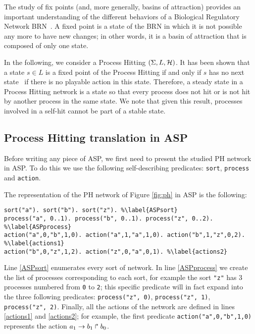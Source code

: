 The study of fix points (and, more generally, basins of attraction) provides an important understanding of the different behaviors of a Biological Regulatory Network BRN~\cite{wuensche1998genomic}.
%
A fixed point is a state of the BRN in which it is not possible any more to have new changes;
in other words, it is a basin of attraction that is composed of only one state.

In the following, we consider a Process Hitting $(\Sigma, L, \mathcal{H})$.
It has been shown that a state $s \in L$ is a fixed point of the Process Hitting if and only if $s$ has no next state~\cite{PMR10-TCSB} \ie if there is no playable action in this state.
Therefore, a steady state in a Process Hitting network is a state so that
every process does not hit or is not hit by another process in the same state.
We note that given this result, processes involved in a self-hit cannot be part of a stable state.

\subsection{Process Hitting translation in ASP}
Before writing any piece of ASP,
we first need to present the studied PH network in ASP.
To do this we use the following self-describing predicates:
\texttt{sort}, \texttt{process} and \texttt{action}.

\begin{example}
\label{ex:asp-ph}
The representation of the PH network of Figure \ref{fig:ph} in ASP is the following:
\begin{lstlisting}
sort("a"). sort("b"). sort("z"). %\label{ASPsort}
process("a", 0..1). process("b", 0..1). process("z", 0..2). %\label{ASPprocess}
action("a",0,"b",1,0). action("a",1,"a",1,0). action("b",1,"z",0,2). %\label{actions1}
action("b",0,"z",1,2). action("z",0,"a",0,1). %\label{actions2}
\end{lstlisting}
Line \ref{ASPsort} enumerates every sort of network.
In line \ref{ASPprocess} we create the list of processes corresponding to each sort,
for example the sort \texttt{"z"} has 3 processes numbered from \texttt{0} to \texttt{2};
this specific predicate will in fact expand into the three following predicates:
\texttt{process("z", 0)}, \texttt{process("z", 1)}, \texttt{process("z", 2)}.
Finally, all the actions of the network are defined in lines \ref{actions1} and \ref{actions2};
for example, the first predicate \texttt{action("a",0,"b",1,0)} represents the action
$a_1\rightarrow b_1\Rsh b_0$.
\end{example}

